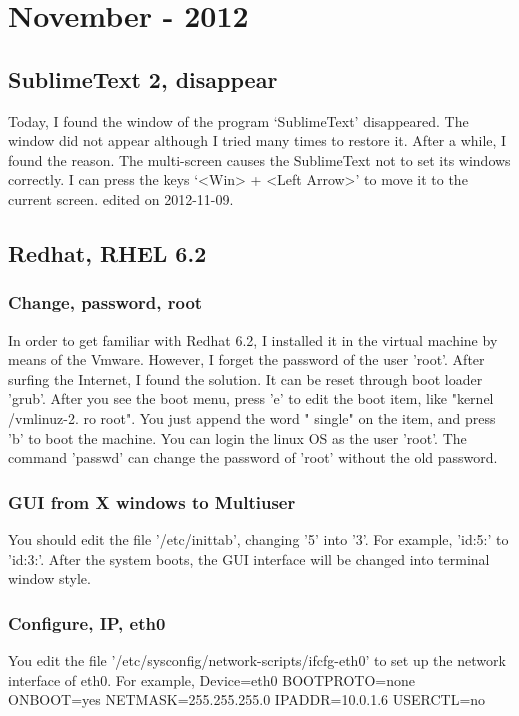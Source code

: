 \chapter{November - 2012} %
\label{ch:nov:2012} %


\section{SublimeText 2, disappear}
Today, I found the window of the program `SublimeText' disappeared. 
The window did not appear although I tried many times to restore it.
After a while, I found the reason. 
The multi-screen causes the SublimeText not to set its windows correctly. 
I can press the keys `<Win> + <Left Arrow>' to move it to the current screen.
\hfill {\tiny  edited on 2012-11-09.}

\section{Redhat, RHEL 6.2}
\subsection{Change, password, root}
In order to get familiar with Redhat 6.2, I installed it in the virtual machine by means of the Vmware.
However, I forget the password of the user 'root'.
After surfing the Internet, I found the solution. 
It can be reset through boot loader 'grub'.
After you see the boot menu, press 'e' to edit the boot item, like "kernel /vmlinuz-2. ro root".
You just append the word " single" on the item, and press 'b' to boot the machine.
You can login the linux OS as the user 'root'.
The command 'passwd' can change the password of 'root' without the old password.

\subsection{GUI from X windows to Multiuser}
You should edit the file '/etc/inittab', changing '5' into '3'.
For example, 'id:5:' to 'id:3:'.
After the system boots, the GUI interface will be changed into terminal window style.

\subsection{Configure, IP, eth0}
You edit the file '/etc/sysconfig/network-scripts/ifcfg-eth0' to set up the network interface of eth0.
For example, 
Device=eth0
BOOTPROTO=none
ONBOOT=yes
NETMASK=255.255.255.0
IPADDR=10.0.1.6
USERCTL=no


